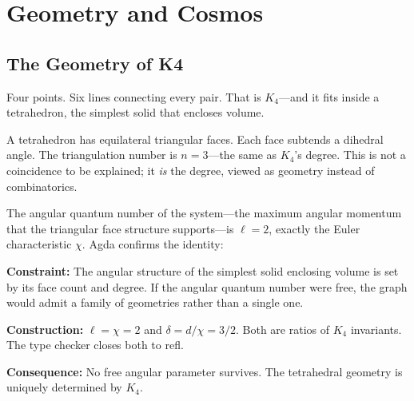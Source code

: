 \documentclass[11pt,a4paper]{book}
\def\texttt#1{#1}%
\def\texorpdfstring#1#2{#2}%
\begin{document}
\part*{Geometry and Cosmos}


\chapter{The Geometry of K\texorpdfstring{$_4$}{4}}
\label{ch:geometry}

Four points. Six lines connecting every pair. That is $K_4$---and it fits inside a tetrahedron, the simplest solid that encloses volume.

A tetrahedron has equilateral triangular faces. Each face subtends a dihedral angle. The triangulation number is $n = 3$---the same as $K_4$'s degree. This is not a coincidence to be explained; it \emph{is} the degree, viewed as geometry instead of combinatorics.

The angular quantum number of the system---the maximum angular momentum that the triangular face structure supports---is $\ell = 2$, exactly the Euler characteristic $\chi$. Agda confirms the identity:

\textbf{Constraint:} The angular structure of the simplest solid enclosing volume is set by its face count and degree. If the angular quantum number were free, the graph would admit a family of geometries rather than a single one.

\textbf{Construction:} $\ell = \chi = 2$ and $\delta = d/\chi = 3/2$. Both are ratios of $K_4$ invariants. The type checker closes both to \texttt{refl}.

\textbf{Consequence:} No free angular parameter survives. The tetrahedral geometry is uniquely determined by $K_4$.

\end{document}
